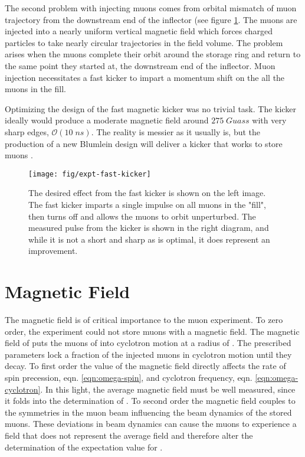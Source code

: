 The second problem with injecting muons comes from orbital mismatch of muon trajectory from the downstream end of the inflector (see figure \ref{fig:expt-fast-kicker}.  The muons are injected into a nearly uniform vertical magnetic field which forces charged particles to take nearly circular trajectories in the field volume.  The problem arises when the muons complete their orbit around the storage ring and return to the same point they started at, the downstream end of the inflector.  Muon injection necessitates a fast kicker to impart a momentum shift on the all the muons in the fill.

Optimizing the design of the \gmtwo fast magnetic kicker was no trivial task.  The kicker ideally would produce a moderate magnetic field around $275\;Guass$ with very sharp edges, $\mathcal{O}(10\;ns)$. The reality is messier as it usually is, but the production of a new Blumlein design will deliver a kicker that works to store muons \cite{e989-tdr}.  

\begin{figure}
\label{fig:expt-fast-kicker}
\texttt{[image: fig/expt-fast-kicker]}
\caption{The desired effect from the fast kicker is shown on the left image.  The fast kicker imparts a single impulse on all muons in the "fill", then turns off and allows the muons to orbit unperturbed.  The measured pulse from the kicker is shown in the right diagram, and while it is not a short and sharp as is optimal, it does represent an improvement.}
\end{figure}

\section{Magnetic Field}

The magnetic field is of critical importance to the muon \gmtwo experiment. To zero order, the experiment could not store muons with a magnetic field.  The magnetic field of \bmagic puts the muons of \pmagic into cyclotron motion at a radius of \rmagic.  The prescribed parameters lock a fraction of the injected muons in cyclotron motion until they decay.  To first order the value of the magnetic field directly affects the rate of spin precession, eqn. \ref{eqn:omega-spin}, and cyclotron frequency, eqn. \ref{eqn:omega-cyclotron}.  In this light, the average magnetic field must be well measured, since it folds into the determination of \wa.  To second order the magnetic field couples to the symmetries in the muon beam influencing the beam dynamics of the stored muons.  These deviations in beam dynamics can cause the muons to experience a field that does not represent the average field and therefore alter the determination of the expectation value for \wa.

